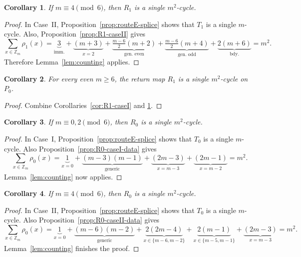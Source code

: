 \documentclass[11pt]{article}
\newtheorem{corollary}{Corollary}
\newcommand{\Zm}{\mathbb Z_m}
\begin{document}
\begin{corollary}\label{cor:R1-caseII}
If $m\equiv 4\pmod 6$, then $R_1$ is a single $m^2$-cycle.
\end{corollary}

\begin{proof}
In Case~II, Proposition~\ref{prop:routeE-splice} shows that $T_1$ is a single $m$-cycle.
Also, Proposition~\ref{prop:R1-caseII} gives
\[
\sum_{x\in \Zm}\rho_1(x)
=
\underbrace{3}_{\text{imm.}}+\underbrace{(m+3)}_{x=2}+\underbrace{\tfrac{m-6}{2}(m+2)}_{\text{gen.\ even}}+\underbrace{\tfrac{m-6}{2}(m+4)}_{\text{gen.\ odd}}+\underbrace{2(m+6)}_{\text{bdy.}}=m^2.
\]
Therefore Lemma~\ref{lem:counting} applies.
\end{proof}

\begin{corollary}\label{cor:R1-all}
For every even $m\ge 6$, the return map $R_1$ is a single $m^2$-cycle on $P_0$.
\end{corollary}

\begin{proof}
Combine Corollaries~\ref{cor:R1-caseI} and \ref{cor:R1-caseII}.
\end{proof}

\begin{corollary}\label{cor:R0-caseI}
If $m\equiv 0,2\pmod 6$, then $R_0$ is a single $m^2$-cycle.
\end{corollary}

\begin{proof}
In Case~I, Proposition~\ref{prop:routeE-splice} shows that $T_0$ is a single $m$-cycle.
Also Proposition~\ref{prop:R0-caseI-data} gives
\[
\sum_{x\in \Zm}\rho_0(x)=\underbrace{1}_{x=0}+\underbrace{(m-3)(m-1)}_{\text{generic}}+\underbrace{(2m-3)}_{x=m{-}3}+\underbrace{(2m-1)}_{x=m{-}2}=m^2.
\]
Lemma~\ref{lem:counting} now applies.
\end{proof}

\begin{corollary}\label{cor:R0-caseII}
If $m\equiv 4\pmod 6$, then $R_0$ is a single $m^2$-cycle.
\end{corollary}

\begin{proof}
In Case~II, Proposition~\ref{prop:routeE-splice} shows that $T_0$ is a single $m$-cycle.
Also Proposition~\ref{prop:R0-caseII-data} gives
\[
\sum_{x\in \Zm}\rho_0(x)=\underbrace{1}_{x=0}+\underbrace{(m-6)(m-2)}_{\text{generic}}+\underbrace{2(2m-4)}_{x\in\{m{-}6,m{-}2\}}+\underbrace{2(m-1)}_{x\in\{m{-}5,m{-}1\}}+\underbrace{(2m-3)}_{x=m{-}3}=m^2.
\]
Lemma~\ref{lem:counting} finishes the proof.
\end{proof}
\end{document}
